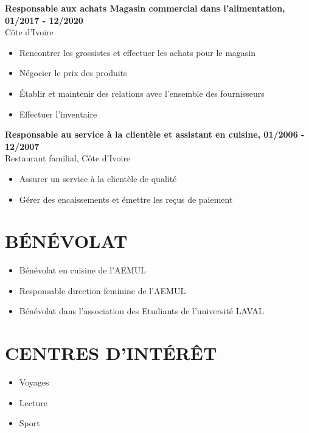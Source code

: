 \documentclass{modernsimplecv}
\begin{document}
\textbf{Responsable aux achats Magasin commercial dans l'alimentation,
01/2017 - 12/2020}\\
Côte d'Ivoire
\begin{itemize}
\item Rencontrer les grossistes et effectuer les achats pour le
magasin 
\item Négocier le prix des produits 
\item Établir et maintenir des
relations avec l'ensemble des fournisseurs 
\item Effectuer
l'inventaire

\end{itemize}


\textbf{Responsable au service à la clientèle et assistant en cuisine,
01/2006 - 12/2007}\\
Restaurant familial, Côte d'Ivoire
\begin{itemize}
\item Assurer un service à la clientèle de qualité 

\item  Gérer des
encaissements et émettre les reçus de paiement

\end{itemize}


\section*{BÉNÉVOLAT}
\begin{itemize}
\item Bénévolat en cuisine de l'AEMUL
\item Responsable direction feminine de l'AEMUL 
\item  Bénévolat dans l'association des Etudiants de l'université LAVAL
\end{itemize}

\section*{CENTRES D'INTÉRÊT}
\begin{itemize}
\item Voyages
\item Lecture
\item  Sport
\end{itemize}



\end{document}
